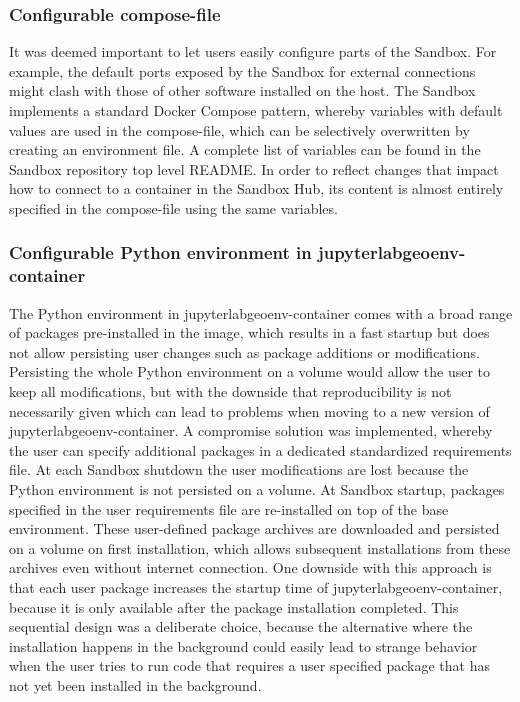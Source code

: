 \documentclass[11pt, a4paper, oneside, parskip=full-]{scrartcl}
\begin{document}
\subsubsection*{Configurable compose-file}
It was deemed important to let users easily configure parts of the Sandbox. For
example, the default ports exposed by the Sandbox for external connections might
clash with those of other software installed on the host. The Sandbox implements
a standard Docker Compose pattern, whereby variables with default values are
used in the compose-file, which can be selectively overwritten by creating an
environment file\cite{composeenvfile}. A complete list of variables can be found
in the Sandbox repository top level README\cite{osgeostacksandbox}. In order to
reflect changes that impact how to connect to a container in the Sandbox Hub,
its content is almost entirely specified in the compose-file using the same
variables.

\subsubsection*{Configurable Python environment in jupyterlabgeoenv-container}
The Python environment in jupyterlabgeoenv-container comes with a broad range of
packages pre-installed in the image, which results in a fast startup but does
not allow persisting user changes such as package additions or modifications.
Persisting the whole Python environment on a volume would allow the user to keep
all modifications, but with the downside that reproducibility is not necessarily
given which can lead to problems when moving to a new version of
jupyterlabgeoenv-container. A compromise solution was implemented, whereby the
user can specify additional packages in a dedicated standardized requirements
file. At each Sandbox shutdown the user modifications are lost because the
Python environment is not persisted on a volume. At Sandbox startup, packages
specified in the user requirements file are re-installed on top of the base
environment. These user-defined package archives are downloaded and persisted on
a volume on first installation, which allows subsequent installations from these
archives even without internet connection. One downside with this approach is
that each user package increases the startup time of jupyterlabgeoenv-container,
because it is only available after the package installation completed. This
sequential design was a deliberate choice, because the alternative where the
installation happens in the background could easily lead to strange behavior
when the user tries to run code that requires a user specified package that has
not yet been installed in the background.
\end{document}
